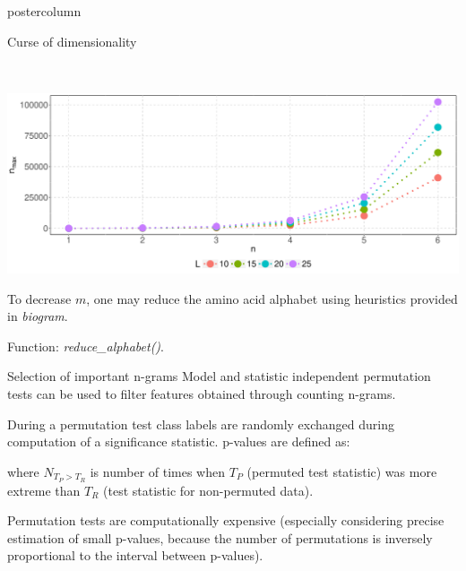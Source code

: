\documentclass[final]{beamer}\usepackage[]{graphicx}\usepackage[]{color}
\makeatletter
\def\maxwidth{ %
  \ifdim\Gin@nat@width>\linewidth
    \linewidth
  \else
    \Gin@nat@width
  \fi
}
\newenvironment{knitrout}{}{} %
\makeatother
\begin{document}
\begin{frame}
\begin{columns}
\begin{column}{.51\textwidth}
\begin{beamercolorbox}[center,wd=\textwidth]{postercolumn}
\begin{minipage}[T]{.95\textwidth}
{\begin{block}{Curse of dimensionality}
\begin{center}
\end{center}

\\



\begin{knitrout}
\color{fgcolor}

{\centering \includegraphics[width=\maxwidth]{figure/unnamed-chunk-4-1} 

}



\end{knitrout}

To decrease $m$, one may reduce the amino acid alphabet using heuristics provided in \textit{biogram}.

Function: \textit{reduce\_alphabet()}.


    \end{block}
    \vfill
    
    \begin{block}{Selection of important n-grams}
    Model and statistic independent permutation tests can be used to filter features obtained through counting n-grams.
    
    During a permutation test class labels are randomly exchanged during computation of a significance statistic. p-values are defined as:
    
\begin{center}
\end{center}

where $N_{T_P > T_R}$ is number of times when $T_P$ (permuted test statistic) 
was more extreme than $T_R$ (test statistic for non-permuted data).

Permutation tests are computationally expensive (especially considering precise 
estimation of small p-values, because the number of permutations is inversely 
proportional to the interval between p-values).


\end{block}}
\end{minipage}
\end{beamercolorbox}
\end{column}
\end{columns}
\end{frame}
\end{document}
